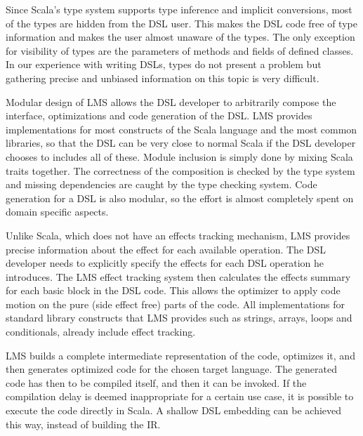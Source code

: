 Since Scala's type system supports type inference and implicit conversions, most of the  types are hidden from the DSL user. This makes the DSL code free of type information and makes the user almost unaware of the  types. The only exception for visibility of  types are the parameters of methods and fields of defined classes. In our experience with writing DSLs,  types do not present a problem but gathering precise and unbiased information on this topic is very difficult.  

Modular design of LMS allows the DSL developer to arbitrarily compose the interface, optimizations and code generation of the DSL. LMS provides implementations for most constructs of the Scala language and the most common libraries, so that the DSL can be very close to normal Scala if the DSL developer chooses to includes all of these. Module inclusion is simply done by mixing Scala traits together. The correctness of the composition is checked by the type system and missing dependencies are caught by the type checking system. Code generation for a DSL is also modular, so the effort is almost completely spent on domain specific aspects.

Unlike Scala, which does not have an effects tracking mechanism, LMS provides precise information about the effect for each available operation. The DSL developer needs to explicitly specify the effects for each DSL operation he introduces. The LMS effect tracking system then calculates the effects summary for each basic block in the DSL code. This allows the optimizer to apply code motion on the pure (side effect free) parts of the code. All implementations for standard library constructs that LMS provides such as strings, arrays, loops and conditionals, already include effect tracking.

LMS builds a complete intermediate representation of the code, optimizes it, and then generates optimized code for the chosen target language. The generated code has then to be compiled itself, and then it can be invoked. If the compilation delay is deemed inappropriate for a certain use case, it is possible to execute the code directly in Scala. A shallow DSL embedding can be achieved this way, instead of building the IR.
 

